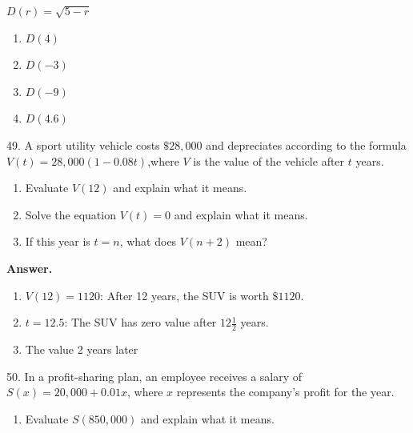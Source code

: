 \documentclass[10pt,]{book}
\theoremstyle{plain}
\theoremstyle{definition}
\theoremstyle{definition}
\theoremstyle{definition}
\begin{document}
\begin{exerciselist}
\begin{exercisegroup}
%
\exercise[48.]\hypertarget{exercise-58}{}\(D(r) =\sqrt{5-r}\) \leavevmode%
\begin{multicols}{2}
\begin{enumerate}[label=\alph*]
\item\hypertarget{li-191}{}\(D(4)\)%
\item\hypertarget{li-192}{}\(D(-3)\)%
\item\hypertarget{li-193}{}\(D(-9)\)%
\item\hypertarget{li-194}{}\(D(4.6)\)%
\end{enumerate}
\end{multicols}
%
\end{exercisegroup}
\par\smallskip\noindent
\item[49.]\hypertarget{exercise-59}{}A sport utility vehicle costs \(\$28,000\) and depreciates according to the formula \(V(t) = 28,000 (1 - 0.08t)\),where \(V\) is the value of the vehicle after \(t\) years. \leavevmode%
\begin{enumerate}[label=\alph*]
\item\hypertarget{li-195}{}Evaluate \(V(12)\) and explain what it means.%
\item\hypertarget{li-196}{}Solve the equation \(V(t) = 0\) and explain what it means.%
\item\hypertarget{li-197}{}If this year is \(t = n\), what does \(V(n + 2)\) mean?%
\end{enumerate}
%
\par\smallskip
\par\smallskip
\noindent\textbf{Answer.}\hypertarget{answer-35}{}\quad
\leavevmode%
\begin{enumerate}[label=\alph*]
\item\hypertarget{li-198}{}\(V(12) = 1120\): After 12 years, the SUV is worth \(\$1120\).%
\item\hypertarget{li-199}{}\(t = 12.5\): The SUV has zero value after \(12\frac{1}{2}\) years.%
\item\hypertarget{li-200}{}The value 2 years later%
\end{enumerate}
%
\item[50.]\hypertarget{exercise-60}{}In a profit-sharing plan, an employee receives a salary of \(S(x) = 20,000 + 0.01x\), where \(x\) represents the company's profit for the year. \leavevmode%
\begin{enumerate}[label=\alph*]
\item\hypertarget{li-201}{}Evaluate \(S(850,000)\) and explain what it means.%

\end{enumerate}
\end{exerciselist}
\end{document}
